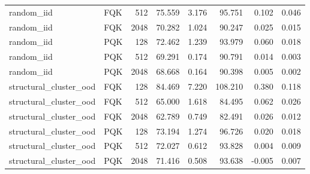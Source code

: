 \begin{tabular}{llrrrrrr}
random\_iid & FQK & 512 & 75.559 & 3.176 & 95.751 & 0.102 & 0.046 \\
random\_iid & FQK & 2048 & 70.282 & 1.024 & 90.247 & 0.025 & 0.015 \\
random\_iid & PQK & 128 & 72.462 & 1.239 & 93.979 & 0.060 & 0.018 \\
random\_iid & PQK & 512 & 69.291 & 0.174 & 90.791 & 0.014 & 0.003 \\
random\_iid & PQK & 2048 & 68.668 & 0.164 & 90.398 & 0.005 & 0.002 \\
structural\_cluster\_ood & FQK & 128 & 84.469 & 7.220 & 108.210 & 0.380 & 0.118 \\
structural\_cluster\_ood & FQK & 512 & 65.000 & 1.618 & 84.495 & 0.062 & 0.026 \\
structural\_cluster\_ood & FQK & 2048 & 62.789 & 0.749 & 82.491 & 0.026 & 0.012 \\
structural\_cluster\_ood & PQK & 128 & 73.194 & 1.274 & 96.726 & 0.020 & 0.018 \\
structural\_cluster\_ood & PQK & 512 & 72.027 & 0.612 & 93.828 & 0.004 & 0.009 \\
structural\_cluster\_ood & PQK & 2048 & 71.416 & 0.508 & 93.638 & -0.005 & 0.007 \\
\bottomrule
\end{tabular}
